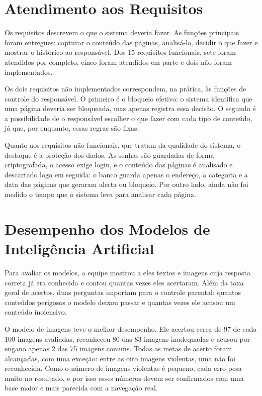 \documentclass[
    12pt,           %
    oneside,        %
    a4paper,        %
    chapter=TITLE,  %
    english,        %
    brazil          %
]{abntex2}
\begin{document}
\section{Atendimento aos Requisitos}

Os requisitos descrevem o que o sistema deveria fazer. As funções principais
foram entregues: capturar o conteúdo das páginas, analisá-lo, decidir o que
fazer e mostrar o histórico ao responsável. Dos 15 requisitos funcionais, sete
foram atendidos por completo, cinco foram atendidos em parte e dois não foram
implementados.

Os dois requisitos não implementados correspondem, na prática, às funções de
controle do responsável. O primeiro é o bloqueio efetivo: o sistema identifica
que uma página deveria ser bloqueada, mas apenas registra essa decisão. O
segundo é a possibilidade de o responsável escolher o que fazer com cada tipo
de conteúdo, já que, por enquanto, essas regras são fixas.

Quanto aos requisitos não funcionais, que tratam da qualidade do sistema, o
destaque é a proteção dos dados. As senhas são guardadas de forma
criptografada, o acesso exige login, e o conteúdo das páginas é analisado e
descartado logo em seguida: o banco guarda apenas o endereço, a categoria e a
data das páginas que geraram alerta ou bloqueio. Por outro lado, ainda não
foi medido o tempo que o sistema leva para analisar cada página.

\section{Desempenho dos Modelos de Inteligência Artificial}

Para avaliar os modelos, a equipe mostrou a eles textos e imagens cuja
resposta correta já era conhecida e contou quantas vezes eles acertaram. Além
da taxa geral de acertos, duas perguntas importam para o controle parental:
quantos conteúdos perigosos o modelo deixou passar e quantas vezes ele acusou
um conteúdo inofensivo.

O modelo de imagens teve o melhor desempenho. Ele acertou cerca de 97 de cada
100 imagens avaliadas, reconheceu 80 das 83 imagens inadequadas e acusou por
engano apenas 2 das 75 imagens comuns. Todas as metas de acerto foram
alcançadas, com uma exceção: entre as oito imagens violentas, uma não foi
reconhecida. Como o número de imagens violentas é pequeno, cada erro pesa
muito no resultado, e por isso esses números devem ser confirmados com uma
base maior e mais parecida com a navegação real.
\end{document}
